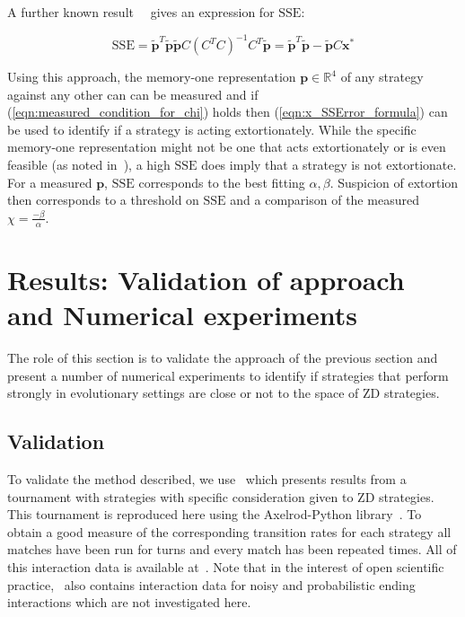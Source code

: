 \documentclass[a4paper]{article}
\newcommand{\SSe}{\text{SSE}}
\begin{document}
A further known result~~\cite{kutner2004applied, rao1973linear,
wakefield2013bayesian} gives an expression for
\(\SSe\):

\begin{equation}\label{eqn:x_SSError_formula}
    \SSe = {\tilde{\textbf{p}}} ^ T \tilde{\textbf{p}}
           \tilde{\textbf{p}} C \left(C ^ T C \right) ^ {-1} C ^ T
           \tilde{\textbf{p}} = {\tilde{\textbf{p}}} ^ T \tilde{\textbf{p}} - \tilde{\textbf{p}} C \textbf{x}^*
\end{equation}

Using this approach, the memory-one representation \(\textbf{p}\in\mathbb{R}^4\) of any
strategy against any other can can be measured and if
(\ref{eqn:measured_condition_for_chi}) holds then (\ref{eqn:x_SSError_formula})
can be used to identify if a strategy is acting extortionately. While the
specific memory-one representation might not be one that acts extortionately or
is even feasible (as noted in~\cite{Press2012}), a
high \(\SSe\) does imply that a strategy is not extortionate. For a measured
\(\textbf{p}\), \(\SSe\) corresponds to the best fitting \(\alpha, \beta\). Suspicion of
extortion then corresponds to a threshold on \(\SSe\) and a comparison of the
measured \(\chi=\frac{-\beta}{\alpha}\).

\section{Results: Validation of approach and Numerical experiments}\label{sec:numerical-experiments}

The role of this section is to validate the approach of the previous section and
present a number of numerical experiments to identify if strategies that perform
strongly in evolutionary settings are close or not to the space of
ZD strategies.

\subsection{Validation}

To validate the method described, we use~\cite{Stewart2012} which
presents results from a tournament with
strategies
with specific consideration given to ZD strategies. This
tournament is reproduced here using the Axelrod-Python
library~\cite{Knight2016}. To obtain a good measure of the corresponding
transition rates for each strategy all matches have been run for
turns and every match has been
repeated times. All of this
interaction data is available at~\cite{vincent_knight_2018_1297075}. Note that
in the interest of open scientific practice,~\cite{vincent_knight_2018_1297075}
also contains interaction data for noisy and probabilistic ending interactions
which are not investigated here.
\end{document}
